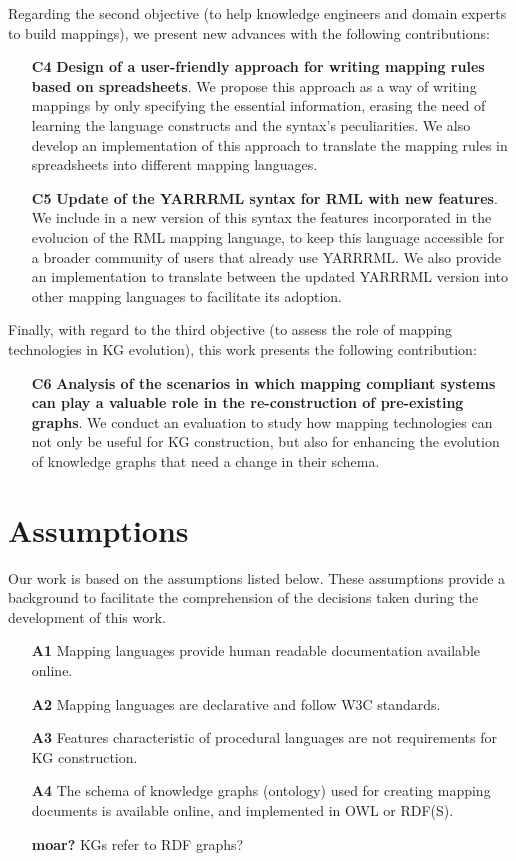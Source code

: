 Regarding the second objective (to help knowledge engineers and domain experts to build mappings), we present new advances with the following contributions:

\begin{enumerate}
    \item[\textbf{C4}] \textbf{Design of a user-friendly approach for writing mapping rules based on spreadsheets}. We propose this approach as a way of writing mappings by only specifying the essential information, erasing the need of learning the language constructs and the syntax's peculiarities. We also develop an implementation of this approach to translate the mapping rules in spreadsheets into different mapping languages. 
    \item[\textbf{C5}] \textbf{Update of the YARRRML syntax for RML with new features}. We include in a new version of this syntax the features incorporated in the evolucion of the RML mapping language, to keep this language accessible for a broader community of users that already use YARRRML. We also provide an implementation to translate between the updated YARRRML version into other mapping languages to facilitate its adoption.
\end{enumerate}

Finally, with regard to the third objective (to assess the role of mapping technologies in KG evolution), this work presents the following contribution:

\begin{enumerate}
    \item[\textbf{C6}]\textbf{ Analysis of the scenarios in which mapping compliant systems can play a valuable role in the re-construction of pre-existing graphs}. We conduct an evaluation to study how mapping technologies can not only be useful for KG construction, but also for enhancing the evolution of knowledge graphs that need a change in their schema. 
\end{enumerate}


\section{Assumptions}
\label{sec:chp3-assumptions}
Our work is based on the assumptions listed below. These assumptions provide a background to facilitate the comprehension of the decisions taken during the development of this work. 


\begin{enumerate}
    \item[\textbf{A1}] Mapping languages provide human readable documentation available online.
    \item[\textbf{A2}] Mapping languages are declarative and follow W3C standards.
    \item[\textbf{A3}] Features characteristic of procedural languages are not requirements for KG construction.
    \item[\textbf{A4}] The schema of knowledge graphs (ontology) used for creating mapping documents is available online, and implemented in OWL or RDF(S). 
    \item[\textbf{moar?}] KGs refer to RDF graphs?
\end{enumerate}


